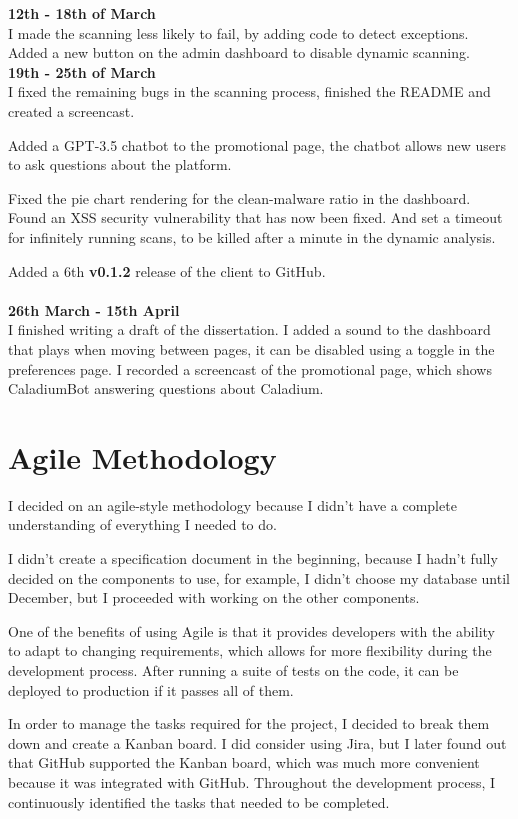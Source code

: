 \textbf{12th - 18th of March} \\
I made the scanning less likely to fail, by adding code to detect exceptions.
Added a new button on the admin dashboard to disable dynamic scanning. \\

\textbf{19th - 25th of March} \\
I fixed the remaining bugs in the scanning process,
finished the README and created a screencast.

Added a GPT-3.5 chatbot to the promotional page,
the chatbot allows new users to ask questions about the platform.

Fixed the pie chart rendering for the clean-malware ratio in the dashboard.
Found an XSS security vulnerability that has now been fixed.
And set a timeout for infinitely running scans,
to be killed after a minute in the dynamic analysis.

Added a 6th \textbf{v0.1.2} release of the client to GitHub. \\ \\

\textbf{26th March - 15th April} \\
I finished writing a draft of the dissertation.
I added a sound to the dashboard that plays when moving between pages,
it can be disabled using a toggle in the preferences page.
I recorded a screencast of the promotional page,
which shows CaladiumBot answering questions about Caladium.

\section{Agile Methodology}
I decided on an agile-style methodology because
I didn't have a complete understanding of everything I needed to do.

I didn't create a specification document in the beginning,
because I hadn't fully decided on the components to use,
for example, I didn't choose my database until December,
but I proceeded with working on the other components.

One of the benefits of using Agile is that it provides developers
with the ability to adapt to changing requirements,
which allows for more flexibility during the development process.
After running a suite of tests on the code,
it can be deployed to production if it passes all of them.

In order to manage the tasks required for the project,
I decided to break them down and create a Kanban board.
I did consider using Jira, but I later found out that
GitHub supported the Kanban board,
which was much more convenient because it was integrated with GitHub.
Throughout the development process,
I continuously identified the tasks that needed to be completed.


